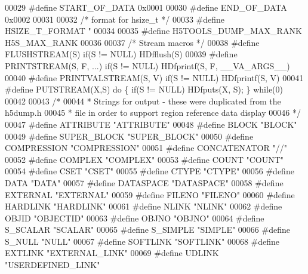 \begin{DoxyCode}
00029 \textcolor{preprocessor}{#define START\_OF\_DATA       0x0001}
00030 \textcolor{preprocessor}{#define END\_OF\_DATA     0x0002}
00031 
00032 \textcolor{comment}{/* format for hsize\_t */}
00033 \textcolor{preprocessor}{#define HSIZE\_T\_FORMAT   "%
00034 
00035 \textcolor{preprocessor}{#define H5TOOLS\_DUMP\_MAX\_RANK     H5S\_MAX\_RANK}
00036 
00037 \textcolor{comment}{/* Stream macros */}
00038 \textcolor{preprocessor}{#define FLUSHSTREAM(S)           if(S != NULL) HDfflush(S)}
00039 \textcolor{preprocessor}{#define PRINTSTREAM(S, F, ...)   if(S != NULL) HDfprintf(S, F, \_\_VA\_ARGS\_\_)}
00040 \textcolor{preprocessor}{#define PRINTVALSTREAM(S, V)   if(S != NULL) HDfprintf(S, V)}
00041 \textcolor{preprocessor}{#define PUTSTREAM(X,S)          do \{ if(S != NULL) HDfputs(X, S); \} while(0)}
00042 
00043 \textcolor{comment}{/*}
00044 \textcolor{comment}{ * Strings for output - these were duplicated from the h5dump.h}
00045 \textcolor{comment}{ * file in order to support region reference data display}
00046 \textcolor{comment}{ */}
00047 \textcolor{preprocessor}{#define ATTRIBUTE       "ATTRIBUTE"}
00048 \textcolor{preprocessor}{#define BLOCK           "BLOCK"}
00049 \textcolor{preprocessor}{#define SUPER\_BLOCK     "SUPER\_BLOCK"}
00050 \textcolor{preprocessor}{#define COMPRESSION     "COMPRESSION"}
00051 \textcolor{preprocessor}{#define CONCATENATOR    "//"}
00052 \textcolor{preprocessor}{#define COMPLEX         "COMPLEX"}
00053 \textcolor{preprocessor}{#define COUNT           "COUNT"}
00054 \textcolor{preprocessor}{#define CSET            "CSET"}
00055 \textcolor{preprocessor}{#define CTYPE           "CTYPE"}
00056 \textcolor{preprocessor}{#define DATA            "DATA"}
00057 \textcolor{preprocessor}{#define DATASPACE       "DATASPACE"}
00058 \textcolor{preprocessor}{#define EXTERNAL        "EXTERNAL"}
00059 \textcolor{preprocessor}{#define FILENO          "FILENO"}
00060 \textcolor{preprocessor}{#define HARDLINK        "HARDLINK"}
00061 \textcolor{preprocessor}{#define NLINK           "NLINK"}
00062 \textcolor{preprocessor}{#define OBJID           "OBJECTID"}
00063 \textcolor{preprocessor}{#define OBJNO           "OBJNO"}
00064 \textcolor{preprocessor}{#define S\_SCALAR        "SCALAR"}
00065 \textcolor{preprocessor}{#define S\_SIMPLE        "SIMPLE"}
00066 \textcolor{preprocessor}{#define S\_NULL          "NULL"}
00067 \textcolor{preprocessor}{#define SOFTLINK        "SOFTLINK"}
00068 \textcolor{preprocessor}{#define EXTLINK         "EXTERNAL\_LINK"}
00069 \textcolor{preprocessor}{#define UDLINK          "USERDEFINED\_LINK"}
}
\end{DoxyCode}

